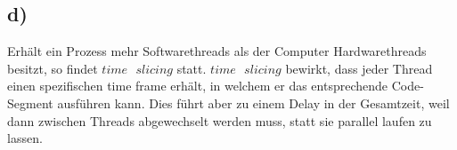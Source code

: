 \documentclass[a4paper, 11pt]{article}
\begin{document}
        \subsection*{d)}
        Erhält ein Prozess mehr Softwarethreads als der Computer Hardwarethreads besitzt, so findet $time \mbox{ } slicing$ statt. $time \mbox{ } slicing$ bewirkt, dass jeder Thread einen spezifischen time frame erhält, in welchem er das entsprechende Code-Segment ausführen kann. Dies führt aber zu einem Delay in der Gesamtzeit, weil dann zwischen Threads abgewechselt werden muss, statt sie parallel laufen zu lassen.
\end{document}
